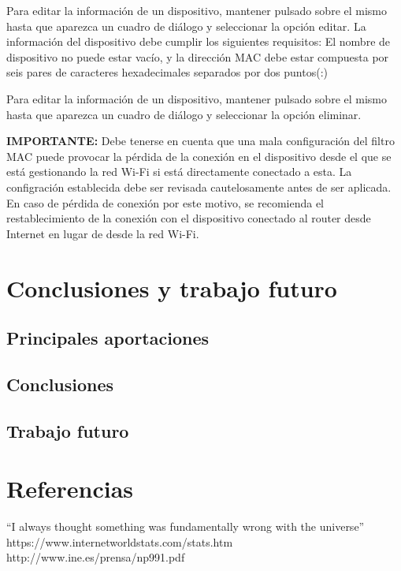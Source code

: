 \documentclass[12pt]{article}
\begin{document}
        Para editar la información de un dispositivo, mantener pulsado sobre el mismo hasta que aparezca un cuadro de diálogo y seleccionar la opción editar. La información del dispositivo debe cumplir los siguientes requisitos: El nombre de dispositivo no puede estar vacío, y la dirección MAC debe estar compuesta por seis pares de caracteres hexadecimales separados por dos puntos(:)

        Para editar la información de un dispositivo, mantener pulsado sobre el mismo hasta que aparezca un cuadro de diálogo y seleccionar la opción eliminar.

        \textbf{IMPORTANTE:} Debe tenerse en cuenta que una mala configuración del filtro MAC puede provocar la pérdida de la conexión en el dispositivo desde el que se está gestionando la red Wi-Fi si está directamente conectado a esta. La configración establecida debe ser revisada cautelosamente antes de ser aplicada. En caso de pérdida de conexión por este motivo, se recomienda el restablecimiento de la conexión con el dispositivo conectado al router desde Internet en lugar de desde la red Wi-Fi.

\section{Conclusiones y trabajo futuro}


    \subsection{Principales aportaciones}




    \subsection{Conclusiones}



    \subsection{Trabajo futuro}


\section{Referencias}
``I always thought something was fundamentally wrong with the universe'' \citep{adams1995hitchhiker}
https://www.internetworldstats.com/stats.htm \citep{hola}
http://www.ine.es/prensa/np991.pdf \citep{Menores que utilizan internet}
\end{document}
